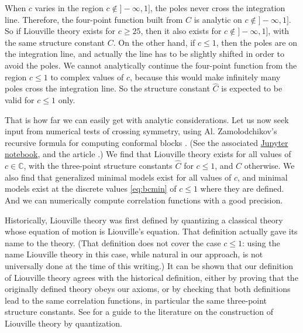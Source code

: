 \documentclass[12pt, a4paper]{article}
\theoremstyle{break}
\begin{document}
When $c$ varies in the region $c\notin ]-\infty,1]$, the poles never cross the integration line.
Therefore, 
the four-point function built from $C$ is analytic on $c\notin ]-\infty,1]$. 
So if Liouville theory exists for $c\geq 25$, then it also exists for $c\notin ]-\infty,1]$, with the same structure constant $C$. 
On the other hand, if $c\leq 1$, then the poles are on the integration line, and actually the line
has to be slightly shifted in order to avoid the poles. 
We cannot analytically continue the four-point function from the region $c\leq 1$ to complex values of $c$, because this would make infinitely many poles cross the integration line.
So the structure constant $\hat C$ is expected to be valid for $c\leq 1$ only.

That is how far we can easily get with analytic considerations. 
Let us now seek input from numerical tests of crossing symmetry, using Al. Zamolodchikov's recursive formula for computing conformal blocks \cite{zz90}. (See the associated \href{https://github.com/ribault/bootstrap-2d-Python/blob/master/Liouville_demo_2.ipynb}{Jupyter notebook}, and the article \cite{rs15}.)
We find that Liouville theory exists for all values of $c\in\mathbb{C}$, with the three-point structure constants $\hat C$ for $c\leq 1$, and $C$ otherwise.
We also find that generalized minimal models exist for all values of $c$, and minimal models exist at the discrete values \eqref{eq:bcmin} of $c\leq 1$ where they are defined. 
And we can numerically compute correlation functions with a good precision.

\begin{tcolorbox}
Historically, Liouville theory was first defined by quantizing a classical theory whose equation of motion is Liouville's equation. That definition actually gave its name to the theory. (That definition does not cover the case $c\leq 1$: using the name Liouville theory in this case, while natural in our approach, is not universally done at the time of this writing.) It can be shown that our definition of Liouville theory agrees with the historical definition, either by proving that the originally defined theory obeys our axioms, or by checking that both definitions lead to the same correlation functions, in particular the same three-point structure constants. See \cite{tes17} for a guide to the literature on the construction of Liouville theory by quantization. 
\end{tcolorbox}

\appendix

\hypersetup{linkcolor=black}
\end{document}
